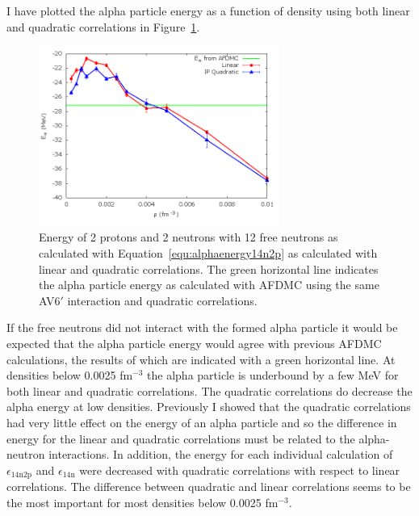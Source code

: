 I have plotted the alpha particle energy as a function of density using both linear and quadratic correlations in Figure~\ref{fig:alpha}.
\begin{figure}[h!]
   \centering
   \includegraphics[width=0.7\textwidth]{figures/alpha.png}
   \caption{Energy of 2 protons and 2 neutrons with 12 free neutrons as calculated with Equation~\ref{equ:alphaenergy14n2p} as calculated with linear and quadratic correlations. The green horizontal line indicates the alpha particle energy as calculated with AFDMC using the same AV6$'$ interaction and quadratic correlations.}
   \label{fig:alpha}
\end{figure}
If the free neutrons did not interact with the formed alpha particle it would be expected that the alpha particle energy would agree with previous AFDMC calculations, the results of which are indicated with a green horizontal line. At densities below 0.0025 fm$^{-3}$ the alpha particle is underbound by a few MeV for both linear and quadratic correlations. The quadratic correlations do decrease the alpha energy at low densities. Previously I showed that the quadratic correlations had very little effect on the energy of an alpha particle and so the difference in energy for the linear and quadratic correlations must be related to the alpha-neutron interactions. In addition, the energy for each individual calculation of $\epsilon_\text{14n2p}$ and $\epsilon_\text{14n}$ were decreased with quadratic correlations with respect to linear correlations. The difference between quadratic and linear correlations seems to be the most important for most densities below 0.0025 fm$^{-3}$.

